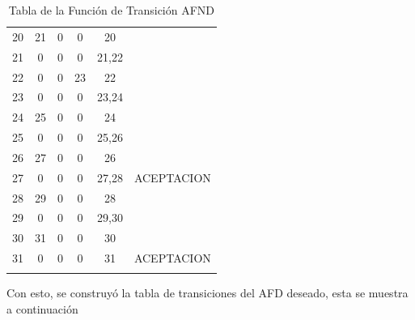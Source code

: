 \begin{longtable}{||c||cccc||c||}
20 & 21 & 0  & 0  & 20      &             \\
21 & 0  & 0  & 0  & 21,22   &             \\
22 & 0  & 0  & 23 & 22      &             \\
23 & 0  & 0  & 0  & 23,24   &             \\
24 & 25 & 0  & 0  & 24      &             \\
25 & 0  & 0  & 0  & 25,26   &             \\
26 & 27 & 0  & 0  & 26      &             \\
27 & 0  & 0  & 0  & 27,28   & ACEPTACION  \\
28 & 29 & 0  & 0  & 28      &             \\
29 & 0  & 0  & 0  & 29,30   &             \\
30 & 31 & 0  & 0  & 30      &             \\
31 & 0  & 0  & 0  & 31      & ACEPTACION  \\
\hline
\hline

\caption{Tabla de la Función de Transición AFND}
\label{AFNDFechas}
\end{longtable}

Con esto, se construyó la tabla de transiciones del AFD deseado, esta se muestra a continuación

